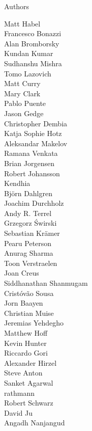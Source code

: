 \documentclass[xcolor=svgnames]{beamer}
\begin{document}
\begin{frame}{Authors}
\begin{multicols}{5}
        Matt Habel\\
        Francesco Bonazzi\\
        Alan Bromborsky\\
        Kundan Kumar\\
        Sudhanshu Mishra\\
        Tomo Lazovich\\
        Matt Curry\\
        Mary Clark\\
        Pablo Puente\\
        Jason Gedge\\
        Christopher Dembia\\
        Katja Sophie Hotz\\
        Aleksandar Makelov\\
        Ramana Venkata\\
        Brian Jorgensen\\
        Robert Johansson\\
        Kendhia\\
        Björn Dahlgren\\
        Joachim Durchholz\\
        Andy R. Terrel\\
        Grzegorz Świrski\\
        Sebastian Krämer\\
        Pearu Peterson\\
        Anurag Sharma\\
        Toon Verstraelen\\
        Joan Creus\\
        Siddhanathan Shanmugam\\
        Cristóvão Sousa\\
        Jorn Baayen\\
        Christian Muise\\
        Jeremias Yehdegho\\
        Matthew Hoff\\
        Kevin Hunter\\
        Riccardo Gori\\
        Alexander Hirzel\\
        Steve Anton\\
        Sanket Agarwal\\
        rathmann\\
        Robert Schwarz\\
        David Ju\\
        Angadh Nanjangud\\

\end{multicols}
\end{frame}
\end{document}
